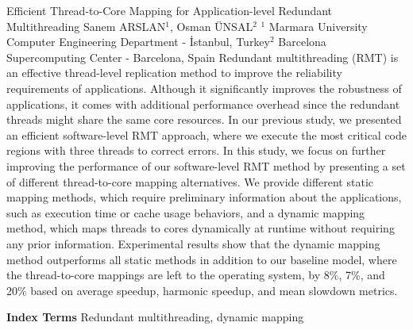 
    \begin{abstract_online}{Efficient Thread-to-Core Mapping for Application-level Redundant Multithreading}{%
        Sanem ARSLAN$^{1}$, Osman ÜNSAL$^{2}$}{%
        }{%
        $^1$ Marmara University Computer Engineering Department - İstanbul, Turkey\newline{}$^2$ Barcelona Supercomputing Center - Barcelona, Spain}
    Redundant multithreading (RMT) is an effective thread-level replication method to improve the reliability requirements of applications. Although it significantly improves the robustness of applications, it comes with additional performance overhead since the redundant threads might share the same core resources. In our previous study, we presented an efficient software-level RMT approach, where we execute the most critical code regions with three threads to correct errors. In this study, we focus on further improving the performance of our software-level RMT method by presenting a set of different thread-to-core mapping alternatives. We provide different static mapping methods, which require preliminary information about the applications, such as execution time or cache usage behaviors, and a dynamic mapping method, which maps threads to cores dynamically at runtime without requiring any prior information. Experimental results show that the dynamic mapping method outperforms all static methods in addition to our baseline model, where the thread-to-core mappings are left to the operating system, by 8\%, 7\%, and 20\% based on average speedup, harmonic speedup, and mean slowdown metrics. 
    
            \textbf{Index Terms} \newline{}Redundant multithreading, dynamic mapping
    \end{abstract_online}
    